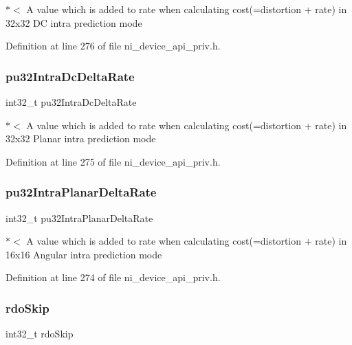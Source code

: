 $\ast$$<$ A value which is added to rate when calculating cost(=distortion + rate) in 32x32 DC intra prediction mode 

Definition at line 276 of file ni\+\_\+device\+\_\+api\+\_\+priv.\+h.

\mbox{\label{struct__ni__t408__config__t_aed18a45e2b9d66e5bd674f527442dba2}} 
\subsubsection{\texorpdfstring{pu32IntraDcDeltaRate}{pu32IntraDcDeltaRate}}
{\footnotesize\ttfamily int32\+\_\+t pu32\+Intra\+Dc\+Delta\+Rate}

$\ast$$<$ A value which is added to rate when calculating cost(=distortion + rate) in 32x32 Planar intra prediction mode 

Definition at line 275 of file ni\+\_\+device\+\_\+api\+\_\+priv.\+h.

\mbox{\label{struct__ni__t408__config__t_aff6047e07afdefc0659c944956cd61c9}} 
\subsubsection{\texorpdfstring{pu32IntraPlanarDeltaRate}{pu32IntraPlanarDeltaRate}}
{\footnotesize\ttfamily int32\+\_\+t pu32\+Intra\+Planar\+Delta\+Rate}

$\ast$$<$ A value which is added to rate when calculating cost(=distortion + rate) in 16x16 Angular intra prediction mode 

Definition at line 274 of file ni\+\_\+device\+\_\+api\+\_\+priv.\+h.

\mbox{\label{struct__ni__t408__config__t_afac86fae56eb3c1b9a8128788d236bc1}} 
\subsubsection{\texorpdfstring{rdoSkip}{rdoSkip}}
{\footnotesize\ttfamily int32\+\_\+t rdo\+Skip}

